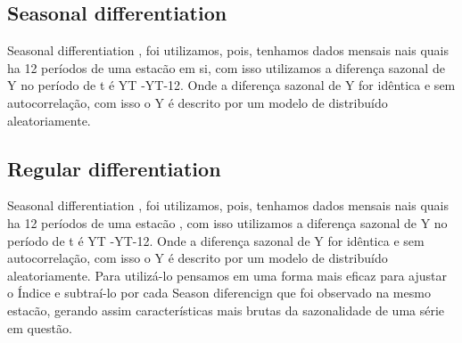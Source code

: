 \documentclass[sigplan,screen]{acmart}
\begin{document}
\subsection{Seasonal differentiation}
Seasonal differentiation , foi utilizamos, pois, tenhamos dados mensais nais quais ha 12 períodos de uma estacão em si, com isso utilizamos a diferença sazonal de Y no período de t é YT -YT-12. Onde a diferença sazonal de Y for idêntica e sem autocorrelação, com isso o Y é descrito por um modelo de distribuído aleatoriamente.

\subsection{Regular differentiation}
Seasonal differentiation , foi utilizamos, pois, tenhamos dados mensais nais quais ha 12 períodos de uma estacão , com isso utilizamos a diferença sazonal de Y no período de t é YT -YT-12. Onde a diferença sazonal de Y for idêntica e sem autocorrelação, com isso o Y é descrito por um modelo de distribuído aleatoriamente.
Para utilizá-lo pensamos em uma forma mais eficaz para ajustar o Índice e subtraí-lo por cada Season diferencign que foi observado na mesmo estacão, gerando assim características mais brutas da sazonalidade de uma série em questão.












\end{document}
